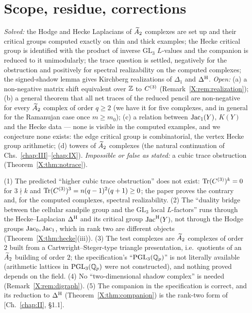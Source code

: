 \section{Scope, residue, corrections}\label{X:sec:scope}

\begin{remark}\label{X:rem:scope}
\emph{Solved:} the Hodge and Hecke Laplacians of $\widetilde A_2$ complexes are set up and their
critical groups computed exactly on thin and thick examples; the Hecke critical group is
identified with the product of inverse $\mathrm{GL}_3$ $L$-values and the companion is
reduced to it unimodularly; the trace question is settled, negatively for the obstruction
and positively for spectral realizability on the computed complexes; the signed-shadow
lemma gives Kirchberg realizations of $\Delta_1$ and $\Delta^{\mathrm{H}}$. \emph{Open:} (a) a non-negative
matrix shift equivalent over $\mathbb{Z}$ to $C^{(3)}$ (Remark~\ref{X:rem:realization}); (b) a
general theorem that all net traces of the reduced pencil are non-negative for every $\widetilde A_2$
complex of order $q\ge2$ (we have it for five complexes, and in general for the Ramanujan
case once $m\ge m_0$); (c) a relation
between $\operatorname{Jac}_1(Y)$, $K(Y)$ and the Hecke data --- none is visible in the computed examples,
and we conjecture none exists: the edge critical group is combinatorial, the vertex Hecke
group arithmetic; (d) towers of $\widetilde A_2$ complexes (the natural continuation of Chs.~\ref{chap:III}--\ref{chap:IX}).
\emph{Impossible or false as stated:} a cubic trace obstruction (Theorem~\ref{X:thm:notrace}).
\end{remark}

\begin{remark}\label{X:rem:corrections}
(1) The predicted ``higher cubic trace obstruction'' does not exist:
$\operatorname{Tr}(C^{(3)})^{k}=0$ for $3\nmid k$ and $\operatorname{Tr}(C^{(3)})^{3}=n(q-1)^{2}(q+1)\ge0$; the paper
proves the contrary and, for the computed complexes, spectral realizability. (2) The
``duality bridge between the cellular sandpile group and the $\mathrm{GL}_3$ local
$L$-factors'' runs through the Hecke--Laplacian $\Delta^{\mathrm{H}}$ and its critical group $\operatorname{Jac}^{\mathrm{H}}(Y)$, not
through the Hodge groups $\operatorname{Jac}_0,\operatorname{Jac}_1$, which in rank two are different objects
(Theorem~\ref{X:thm:hecke}(iii)). (3) The test complexes are $\widetilde A_2$ complexes of order $2$
built from a Cartwright--Steger-type triangle presentation, i.e.\ quotients of an $\widetilde A_2$
building of order $2$; the specification's ``$\mathrm{PGL}_3(\mathbb{Q}_p)$'' is not literally available
(arithmetic lattices in $\mathrm{PGL}_3(\mathbb{Q}_p)$ were not constructed), and nothing proved depends on
the field. (4) No ``two-dimensional shadow complex'' is needed
(Remark~\ref{X:rem:digraph}). (5) The companion in the specification is correct, and its
reduction to $\Delta^{\mathrm{H}}$ (Theorem~\ref{X:thm:companion}) is the rank-two form of [Ch.~\ref{chap:II}, \S1.1].
\end{remark}

